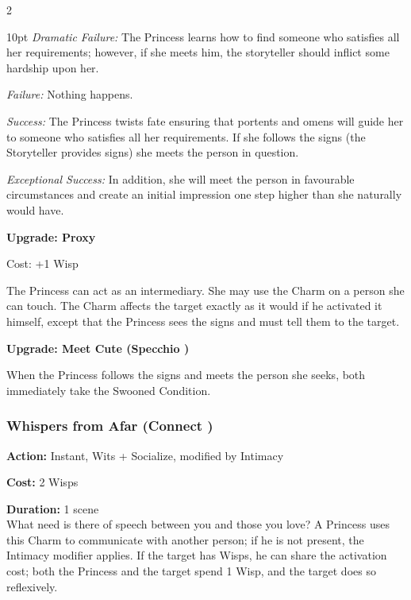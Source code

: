 \begin{multicols}{2}
\begin{myindentpar}{10pt}
    \emph{Dramatic Failure:} The Princess learns how to find someone who satisfies all her requirements; however, if she meets him, the storyteller should inflict some hardship upon her.
    
    \emph{Failure:} Nothing happens. 
    
    \emph{Success:} The Princess twists fate ensuring that portents and omens will guide her to someone who satisfies all her requirements. If she follows the signs (the Storyteller provides signs) she meets the person in question.
    
    \emph{Exceptional Success:} In addition, she will meet the person in favourable circumstances and create an initial impression one step higher than she naturally would have.
    
    \textbf{Upgrade: Proxy}
    
    Cost: +1 Wisp 
    
    The Princess can act as an intermediary. She may use the Charm on a person she can touch. The Charm affects the target exactly as it would if he activated it himself, except that the Princess sees the signs and must tell them to the target.    
	
	\textbf{Upgrade: Meet Cute (Specchio \textbullet\textbullet\textbullet)}
	
	When the Princess follows the signs and meets the person she seeks, both immediately take the Swooned Condition. 
	
\end{myindentpar}

\subsubsection*{Whispers from Afar (Connect \textbullet\textbullet\textbullet)}

\noindent \textbf{Action:} Instant, Wits + Socialize, modified by Intimacy

\noindent \textbf{Cost:} 2 Wisps

\noindent \textbf{Duration:} 1 scene \\

\noindent What need is there of speech between you and those you love? A Princess uses this Charm to communicate with another person; if he is not present, the Intimacy modifier applies. If the target has Wisps, he can share the activation cost; both the Princess and the target spend 1 Wisp, and the target does so reflexively. \\



\end{multicols}
